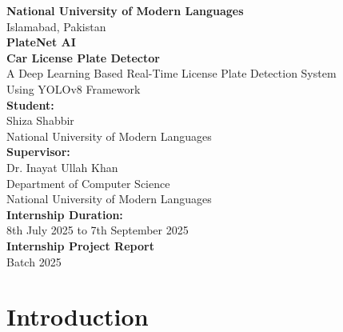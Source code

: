\documentclass[12pt,a4paper]{article}
\begin{document}
\begin{titlepage}
\centering

\vspace*{1cm}
{\Large \textbf{National University of Modern Languages}}\\
{\large Islamabad, Pakistan}\\[2cm]

\vspace*{1cm}
{\Huge \textbf{PlateNet AI}}\\[0.5cm]
{\Large \textbf{Car License Plate Detector}}\\[1cm]

\vspace*{1cm}
{\large A Deep Learning Based Real-Time License Plate Detection System}\\
{\large Using YOLOv8 Framework}\\[2cm]

\vspace*{1cm}
\textbf{Student:}\\
Shiza Shabbir\\
National University of Modern Languages\\[1cm]

\textbf{Supervisor:}\\
Dr. Inayat Ullah Khan\\[2cm]

\vspace*{1cm}
{\large Department of Computer Science}\\
{\large National University of Modern Languages}\\[1cm]

\vspace*{1cm}
{\large \textbf{Internship Duration:}}\\
{\large 8th July 2025 to 7th September 2025}\\[2cm]

\vfill
{\large \textbf{Internship Project Report}}\\
{\large Batch 2025}

\end{titlepage}

\tableofcontents
\newpage

\section{Introduction}
\end{document}
